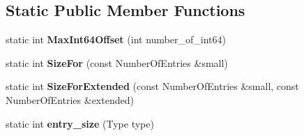\subsection*{Static Public Member Functions}
\begin{DoxyCompactItemize}
\item 
\hypertarget{classv8_1_1internal_1_1_constant_pool_array_a694aa488d4e04cd492713caaadd03ca0}{}static int {\bfseries Max\+Int64\+Offset} (int number\+\_\+of\+\_\+int64)\label{classv8_1_1internal_1_1_constant_pool_array_a694aa488d4e04cd492713caaadd03ca0}

\item 
\hypertarget{classv8_1_1internal_1_1_constant_pool_array_aa9d41d8bed9aec428eab5bd420193815}{}static int {\bfseries Size\+For} (const Number\+Of\+Entries \&small)\label{classv8_1_1internal_1_1_constant_pool_array_aa9d41d8bed9aec428eab5bd420193815}

\item 
\hypertarget{classv8_1_1internal_1_1_constant_pool_array_ad2d6dded3f2f2fdc909842d4aa2dcb72}{}static int {\bfseries Size\+For\+Extended} (const Number\+Of\+Entries \&small, const Number\+Of\+Entries \&extended)\label{classv8_1_1internal_1_1_constant_pool_array_ad2d6dded3f2f2fdc909842d4aa2dcb72}

\item 
\hypertarget{classv8_1_1internal_1_1_constant_pool_array_ad0410289fd70c0d4b529e8f780af641a}{}static int {\bfseries entry\+\_\+size} (Type type)\label{classv8_1_1internal_1_1_constant_pool_array_ad0410289fd70c0d4b529e8f780af641a}

\end{DoxyCompactItemize}
